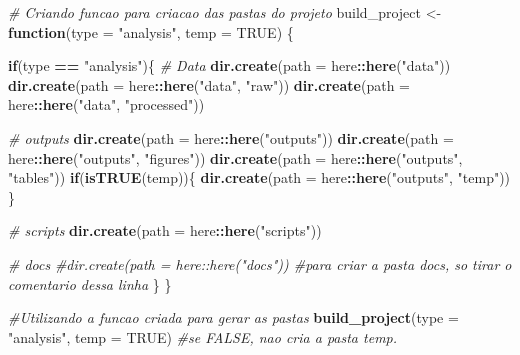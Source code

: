 \documentclass[
]{book}
\newenvironment{Shaded}{\begin{snugshade}}{\end{snugshade}}
\newcommand{\AttributeTok}[1]{\textcolor[rgb]{0.13,0.29,0.53}{#1}}
\newcommand{\CommentTok}[1]{\textcolor[rgb]{0.56,0.35,0.01}{\textit{#1}}}
\newcommand{\ConstantTok}[1]{\textcolor[rgb]{0.56,0.35,0.01}{#1}}
\newcommand{\ControlFlowTok}[1]{\textcolor[rgb]{0.13,0.29,0.53}{\textbf{#1}}}
\newcommand{\FunctionTok}[1]{\textcolor[rgb]{0.13,0.29,0.53}{\textbf{#1}}}
\newcommand{\NormalTok}[1]{#1}
\newcommand{\OtherTok}[1]{\textcolor[rgb]{0.56,0.35,0.01}{#1}}
\newcommand{\SpecialCharTok}[1]{\textcolor[rgb]{0.81,0.36,0.00}{\textbf{#1}}}
\newcommand{\StringTok}[1]{\textcolor[rgb]{0.31,0.60,0.02}{#1}}
\begin{document}
\begin{Shaded}
\begin{Highlighting}[]
\CommentTok{\# Criando funcao para criacao das pastas do projeto}
\NormalTok{build\_project }\OtherTok{\textless{}{-}} \ControlFlowTok{function}\NormalTok{(}\AttributeTok{type =} \StringTok{"analysis"}\NormalTok{,}
                          \AttributeTok{temp =} \ConstantTok{TRUE}\NormalTok{) \{}
  
  \ControlFlowTok{if}\NormalTok{(type }\SpecialCharTok{==} \StringTok{"analysis"}\NormalTok{)\{}
    \CommentTok{\# Data}
    \FunctionTok{dir.create}\NormalTok{(}\AttributeTok{path =}\NormalTok{ here}\SpecialCharTok{::}\FunctionTok{here}\NormalTok{(}\StringTok{"data"}\NormalTok{))}
    \FunctionTok{dir.create}\NormalTok{(}\AttributeTok{path =}\NormalTok{ here}\SpecialCharTok{::}\FunctionTok{here}\NormalTok{(}\StringTok{"data"}\NormalTok{, }\StringTok{"raw"}\NormalTok{))}
    \FunctionTok{dir.create}\NormalTok{(}\AttributeTok{path =}\NormalTok{ here}\SpecialCharTok{::}\FunctionTok{here}\NormalTok{(}\StringTok{"data"}\NormalTok{, }\StringTok{"processed"}\NormalTok{))}
    
    \CommentTok{\# outputs}
    \FunctionTok{dir.create}\NormalTok{(}\AttributeTok{path =}\NormalTok{ here}\SpecialCharTok{::}\FunctionTok{here}\NormalTok{(}\StringTok{"outputs"}\NormalTok{))}
    \FunctionTok{dir.create}\NormalTok{(}\AttributeTok{path =}\NormalTok{ here}\SpecialCharTok{::}\FunctionTok{here}\NormalTok{(}\StringTok{"outputs"}\NormalTok{, }\StringTok{"figures"}\NormalTok{))}
    \FunctionTok{dir.create}\NormalTok{(}\AttributeTok{path =}\NormalTok{ here}\SpecialCharTok{::}\FunctionTok{here}\NormalTok{(}\StringTok{"outputs"}\NormalTok{, }\StringTok{"tables"}\NormalTok{))}
    \ControlFlowTok{if}\NormalTok{(}\FunctionTok{isTRUE}\NormalTok{(temp))\{}
      \FunctionTok{dir.create}\NormalTok{(}\AttributeTok{path =}\NormalTok{ here}\SpecialCharTok{::}\FunctionTok{here}\NormalTok{(}\StringTok{"outputs"}\NormalTok{, }\StringTok{"temp"}\NormalTok{))}
\NormalTok{    \}}
    
    \CommentTok{\# scripts}
    \FunctionTok{dir.create}\NormalTok{(}\AttributeTok{path =}\NormalTok{ here}\SpecialCharTok{::}\FunctionTok{here}\NormalTok{(}\StringTok{"scripts"}\NormalTok{))}
    
    \CommentTok{\# docs}
    \CommentTok{\#dir.create(path = here::here("docs")) \#para criar a pasta docs, so tirar o comentario dessa linha}
\NormalTok{  \}}
\NormalTok{\}}

\CommentTok{\#Utilizando a funcao criada para gerar as pastas}
\FunctionTok{build\_project}\NormalTok{(}\AttributeTok{type =} \StringTok{"analysis"}\NormalTok{,}
              \AttributeTok{temp =} \ConstantTok{TRUE}\NormalTok{) }\CommentTok{\#se FALSE, nao cria a pasta temp.}
\end{Highlighting}
\end{Shaded}
\end{document}
